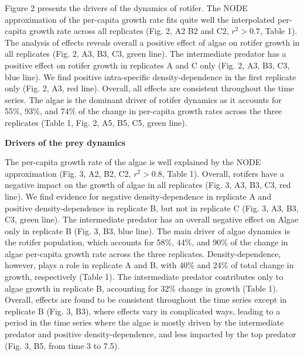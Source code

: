 \documentclass[11pt, oneside]{article}
\begin{document}
Figure 2 presents the drivers of the dynamics of rotifer.
The NODE approximation of the per-capita growth rate fits quite well the interpolated per-capita growth rate across all replicates (Fig. 2, A2 B2 and C2, $r^2 > 0.7$, Table 1).
The analysis of effects reveals overall a positive effect of algae on rotifer growth in all replicates (Fig. 2, A3, B3, C3, green line). 
The intermediate predator has a positive effect on rotifer growth in replicates A and C only (Fig. 2, A3, B3, C3, blue line).
We find positive intra-specific density-dependence in the first replicate only (Fig. 2, A3, red line).
Overall, all effects are consistent throughout the time series.
The algae is the dominant driver of rotifer dynamics as it accounts for 55\%, 93\%, and 74\% of the change in per-capita growth rates across the three replicates (Table 1, Fig. 2, A5, B5, C5, green line).

\textbf{Drivers of the prey dynamics}

The per-capita growth rate of the algae is well explained by the NODE approximation (Fig. 3, A2, B2, C2, $r^2 > 0.8$, Table 1).
Overall, rotifers have a negative impact on the growth of algae in all replicates (Fig. 3, A3, B3, C3, red line).
We find evidence for negative density-dependence in replicate A and positive density-dependence in replicate B, but not in replicate C (Fig. 3, A3, B3, C3, green line).
The intermediate predator has an overall negative effect on Algae only in replicate B (Fig. 3, B3, blue line).
The main driver of algae dynamics is the rotifer population, which accounts for 58\%, 44\%, and 90\% of the change in algae per-capita growth rate across the three replicates.
Density-dependence, however, plays a role in replicate A and B, with 40\% and 24\% of total change in growth, respectively (Table 1).
The intermediate predator contributes only to algae growth in replicate B, accounting for 32\% change in growth (Table 1).
Overall, effects are found to be consistent throughout the time series except in replicate B (Fig. 3, B3), where effects vary in complicated ways, leading to a period in the time series where the algae is mostly driven by the intermediate predator and positive density-dependence, and less impacted by the top predator (Fig. 3, B5, from time 3 to 7.5).
\end{document}
